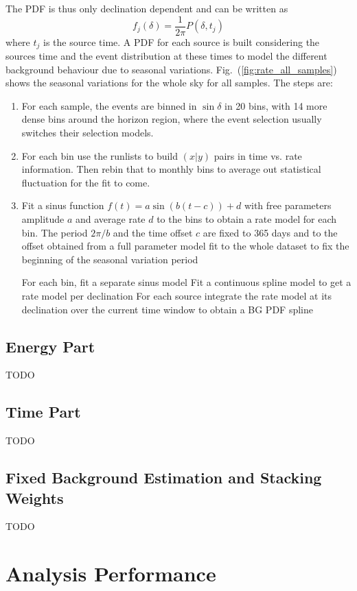 The PDF is thus only declination dependent and can be written as
\begin{equation}
  f_j(\delta) = \frac{1}{2\pi}P(\delta, t_j)
\end{equation}
where $t_j$ is the source time.
A PDF for each source is built considering the sources time and the event distribution at these times to model the different background behaviour due to seasonal variations.
Fig.~(\ref{fig:rate_all_samples}) shows the seasonal variations for the whole sky for all samples.
The steps are:
\begin{enumerate}
  \item For each sample, the events are binned in $\sin\delta$ in 20 bins, with 14 more dense bins around the horizon region, where the event selection usually switches their selection models.
  \item For each bin use the runlists to build $(x|y)$ pairs in time vs. rate information.
  Then rebin that to monthly bins to average out statistical fluctuation for the fit to come.
  \item Fit a sinus function $f(t) = a \sin(b(t-c)) + d$ with free parameters amplitude $a$ and average rate $d$ to the bins to obtain a rate model for each bin.
  The period $2\pi/b$ and the time offset $c$ are fixed to 365 days and to the offset obtained from a full parameter model fit to the whole dataset to fix the beginning of the seasonal variation period

For each bin, fit a separate sinus model
Fit a continuous spline model to get a rate model per declination
For each source integrate the rate model at its declination over the current time window to obtain a BG PDF spline
\end{enumerate}

\subsection{Energy Part}
TODO

\subsection{Time Part}
TODO

\subsection{Fixed Background Estimation and Stacking Weights}
TODO



\section{Analysis Performance}



